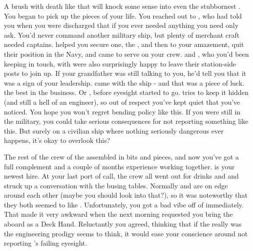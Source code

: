 \documentclass[char]{TMFHope}
\begin{document}
A brush with death like that will knock some sense into even the stubbornest \cCap{\human}. You began to pick up the pieces of your life. You reached out to \cXO{}, who had told you when you were discharged that if you ever needed anything you need only ask. You'd never command another military ship, but plenty of merchant craft needed captains. \cXO{} helped you secure one, the \pNew{}, and then to your amazement, quit their position in the Navy, and came to serve on your crew. \cMed{} and \cSci{}, who you'd been keeping in touch, with were also surprisingly happy to leave their station-side posts to join up. If your grandfather was still talking to you, he'd tell you that it was a sign of your leadership. \cEng{} came with the ship - and that was a piece of luck. \cEng{\They} \cEng{\are} the best in the business. Or \cEng{\were}, before \cEng{\their} eyesight started to go. \cEng{} tries to keep it hidden (and \cEng{\they} \cEng{\are} still a hell of an engineer), so out of respect you've kept quiet that you've noticed. You hope you won't regret bending policy like this. If you were still in the military, you could take serious consequences for not reporting something like this. But surely on a civilian ship where nothing seriously dangerous ever happens, it's okay to overlook this?

The rest of the crew of the \pNew{} assembled in bits and pieces, and now you've got a full complement and a couple of months experience working together. \cBoy{} is your newest hire. At your last port of call, the crew all went out for drinks and \cNav{} and \cEng{} struck up a conversation with the \cBoy{\kid} busing tables. Normally \cNav{} and \cEng{} are on edge around each other (maybe you should look into that?), so it was noteworthy that they both seemed to like \cBoy{}. Unfortunately, you got a bad vibe off of \cBoy{} immediately. That made it very awkward when the next morning \cEng{} requested you bring the \cBoy{\kid} aboard as a Deck Hand. Reluctantly you agreed, thinking that if the \cBoy{\kid} really was the engineering prodigy \cEng{} seems to think, it would ease your conscience around not reporting \cEng{}'s failing eyesight. 
\end{document}
